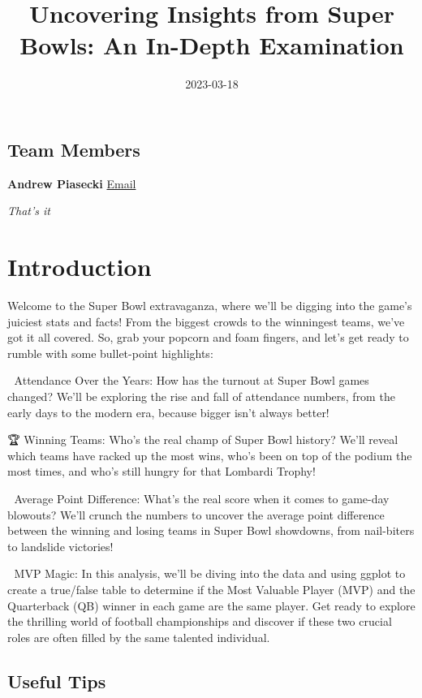 \documentclass[
]{article}
\title{Uncovering Insights from Super Bowls: An In-Depth Examination}
\author{}
\date{\vspace{-2.5em}2023-03-18}
\begin{document}
\maketitle

\hypertarget{team-members}{%
\subsection{Team Members}\label{team-members}}

\textbf{Andrew Piasecki}
\href{mailto:apiasecki0881@floridapoly.edu}{Email}

\emph{That's it}

\hypertarget{introduction}{%
\section{Introduction}\label{introduction}}

Welcome to the Super Bowl extravaganza, where we'll be digging into the
game's juiciest stats and facts! From the biggest crowds to the
winningest teams, we've got it all covered. So, grab your popcorn and
foam fingers, and let's get ready to rumble with some bullet-point
highlights:

🏈 Attendance Over the Years: How has the turnout at Super Bowl games
changed? We'll be exploring the rise and fall of attendance numbers,
from the early days to the modern era, because bigger isn't always
better!

🏆 Winning Teams: Who's the real champ of Super Bowl history? We'll
reveal which teams have racked up the most wins, who's been on top of
the podium the most times, and who's still hungry for that Lombardi
Trophy!

🔢 Average Point Difference: What's the real score when it comes to
game-day blowouts? We'll crunch the numbers to uncover the average point
difference between the winning and losing teams in Super Bowl showdowns,
from nail-biters to landslide victories!

🏅 MVP Magic: In this analysis, we'll be diving into the data and using
ggplot to create a true/false table to determine if the Most Valuable
Player (MVP) and the Quarterback (QB) winner in each game are the same
player. Get ready to explore the thrilling world of football
championships and discover if these two crucial roles are often filled
by the same talented individual.

\hypertarget{useful-tips}{%
\subsection{Useful Tips}\label{useful-tips}}
\end{document}
